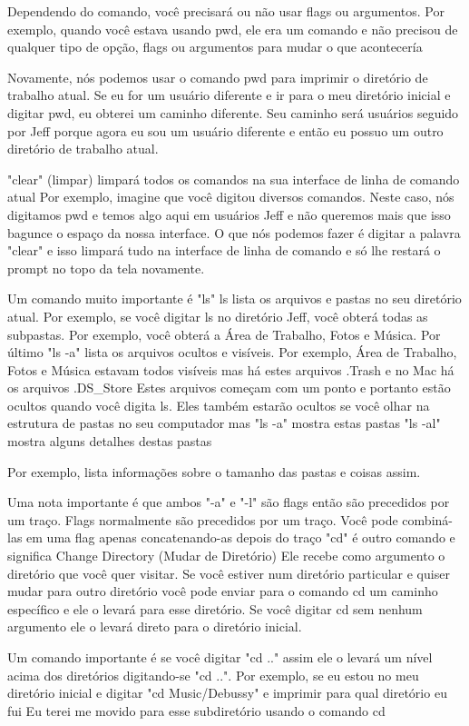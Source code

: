 Dependendo do comando, você precisará ou não usar flags ou argumentos. Por exemplo, quando você estava usando pwd, ele era um comando e não precisou de qualquer tipo de opção, flags ou argumentos para mudar o que acontecería 

Novamente, nós podemos usar o comando pwd para imprimir o diretório de trabalho atual. Se eu for um usuário diferente e ir para o meu diretório inicial e digitar pwd, eu obterei um caminho diferente. Seu caminho será usuários seguido por Jeff porque agora eu sou um usuário diferente e então eu possuo um outro diretório de trabalho atual.

"clear" (limpar) limpará todos os comandos na sua interface de linha de comando atual Por exemplo, imagine que você digitou diversos comandos. Neste caso, nós digitamos pwd e temos algo aqui em usuários Jeff e não queremos mais que isso bagunce o espaço da nossa interface. O que nós podemos fazer é digitar a palavra "clear" e isso limpará tudo na interface de linha de comando e só lhe restará o prompt no topo da tela novamente. 

Um comando muito importante é "ls" ls lista os arquivos e pastas no seu diretório atual. Por exemplo, se você digitar ls no diretório Jeff, você obterá todas as subpastas. Por exemplo, você obterá a Área de Trabalho, Fotos e Música. Por último "ls -a" lista os arquivos ocultos e visíveis. Por exemplo, Área de Trabalho, Fotos e Música estavam todos visíveis mas há estes arquivos .Trash e no Mac há os arquivos .DS\_Store Estes arquivos começam com um ponto e portanto estão ocultos quando você digita ls. Eles também estarão ocultos se você olhar na estrutura de pastas no seu computador mas "ls -a" mostra estas pastas "ls -al" mostra alguns detalhes destas pastas 

Por exemplo, lista informações sobre o tamanho das pastas e coisas assim. 

Uma nota importante é que ambos "-a" e "-l" são flags então são precedidos por um traço. Flags normalmente são precedidos por um traço. Você pode combiná-las em uma flag apenas concatenando-as depois do traço "cd" é outro comando e significa Change Directory (Mudar de Diretório) Ele recebe como argumento o diretório que você quer visitar. Se você estiver num diretório particular e quiser mudar para outro diretório você pode enviar para o comando cd um caminho específico e ele o levará para esse diretório. Se você digitar cd sem nenhum argumento ele o levará direto para o diretório inicial.

Um comando importante é se você digitar "cd .." assim ele o levará um nível acima dos diretórios digitando-se "cd ..". Por exemplo, se eu estou no meu diretório inicial e digitar "cd Music/Debussy" e imprimir para qual diretório eu fui Eu terei me movido para esse subdiretório usando o comando cd 

